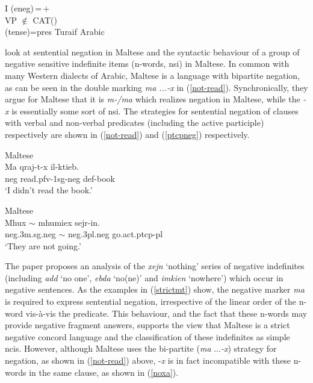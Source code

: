 \documentclass[output=paper,hidelinks]{langscibook}
\begin{document}
\ea\label{lex-mu}
 {I}{
{(\UP\sc eneg)\,=\,$+$}\\
VP $\notin$ CAT(\UP)\\
{(\UP\sc tense)={\sc pres}}
} \hfill{Turaif Arabic \citep[170]{Alruwaili:PhD} }
\z


\citet{camilleri-sadler:2017}
look at sentential negation in Maltese and the syntactic behaviour of a group of negative sensitive indefinite items (n-words, {\sc nsi})  in Maltese.  In common with many Western dialects of Arabic, Maltese is a language with bipartite negation, as can be seen in the double marking {\em ma ...-x} in (\ref{not-read}).   Synchronically, they argue for Maltese that it is {\em m-/ma} which realizes negation in Maltese, while the {\em -x} is essentially some sort of {\sc nsi}.  The strategies for sentential negation of clauses with verbal and non-verbal predicates (including the active participle) respectively are shown in (\ref{not-read}) and (\ref{ptcpneg}) respectively.




\ea\label{not-read} Maltese \citep[147]{camilleri-sadler:2017}\\
\gll Ma qraj-t-x il-ktieb.\\
{\sc neg} read.{\sc pfv-1sg-neg} {\sc def-}book\\
\glt `I didn't read the book.'
\z




\ea\label{ptcpneg} Maltese \citep[147]{camilleri-sadler:2017} \\
\gll Mhux $\sim$ mhumiex sejr-in.\\
{\sc neg.3m.sg.neg} $\sim$ {\sc neg.3pl.neg} go.{\sc act.ptcp-pl}\\
\glt `They are not going.'
\z



The paper proposes an analysis of  the {\em xejn} `nothing' series of negative indefinites (including {\em {\hwithstroke}add} `no one', {\em ebda} `no(ne)' and {\em imkien} `nowhere') which occur in negative sentences.
As the examples in (\ref{strictmt})  show, the negative marker {\em ma} is required to express sentential negation, irrespective of the linear order of
the n-word  vis-{\`a}-vis the predicate. This behaviour,  and  the fact that these n-words may  provide negative fragment answers,   supports the view that Maltese
 is a strict negative concord language and the classification of these indefinites as  simple {\sc nci}s.
However, although Maltese uses the bi-partite ({\em ma} ...{\em -x}) strategy for
negation, as shown in (\ref{not-read}) above, -\emph{x} is in fact incompatible with these n-words in the same clause, as shown in (\ref{noxa}).
\end{document}
